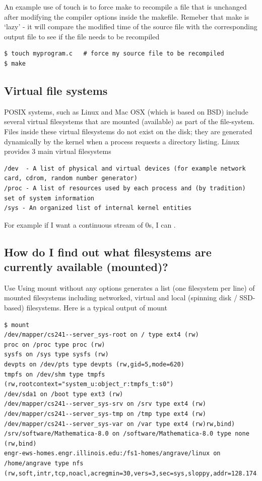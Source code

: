 An example use of touch is to force make to recompile a file that is unchanged after modifying the compiler options inside the makefile. Remeber that make is `lazy' - it will compare the modified time of the source file with the corresponding output file to see if the file needs to be recompiled

\begin{lstlisting}
$ touch myprogram.c   # force my source file to be recompiled
$ make
\end{lstlisting}

\subsection{Virtual file systems}\label{virtual-file-systems}

POSIX systems, such as Linux and Mac OSX (which is based on BSD) include several virtual filesystems that are mounted (available) as part of the file-system. Files inside these virtual filesystems do not exist on the disk; they are generated dynamically by the kernel when a process requests a directory listing. Linux provides 3 main virtual filesystems

\begin{lstlisting}
/dev  - A list of physical and virtual devices (for example network card, cdrom, random number generator)
/proc - A list of resources used by each process and (by tradition) set of system information
/sys - An organized list of internal kernel entities
\end{lstlisting}

For example if I want a continuous stream of 0s, I can .

\subsection{How do I find out what filesystems are currently available (mounted)?}\label{how-do-i-find-out-what-filesystems-are-currently-available-mounted}

Use  Using mount without any options generates a list (one filesystem per line) of mounted filesystems including networked, virtual and local (spinning disk / SSD-based) filesystems. Here is a typical output of mount

\begin{lstlisting}
$ mount
/dev/mapper/cs241--server_sys-root on / type ext4 (rw)
proc on /proc type proc (rw)
sysfs on /sys type sysfs (rw)
devpts on /dev/pts type devpts (rw,gid=5,mode=620)
tmpfs on /dev/shm type tmpfs (rw,rootcontext="system_u:object_r:tmpfs_t:s0")
/dev/sda1 on /boot type ext3 (rw)
/dev/mapper/cs241--server_sys-srv on /srv type ext4 (rw)
/dev/mapper/cs241--server_sys-tmp on /tmp type ext4 (rw)
/dev/mapper/cs241--server_sys-var on /var type ext4 (rw)rw,bind)
/srv/software/Mathematica-8.0 on /software/Mathematica-8.0 type none (rw,bind)
engr-ews-homes.engr.illinois.edu:/fs1-homes/angrave/linux on /home/angrave type nfs (rw,soft,intr,tcp,noacl,acregmin=30,vers=3,sec=sys,sloppy,addr=128.174.252.102)
\end{lstlisting}

